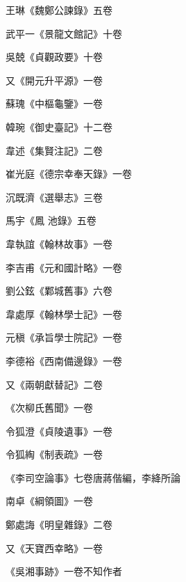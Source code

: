 \begin{pinyinscope}
 王琳《魏鄭公諫錄》五卷



 武平一《景龍文館記》十卷



 吳兢《貞觀政要》十卷



 又《開元升平源》一卷



 蘇瑰《中樞龜鑒》一卷



 韓琬《御史臺記》十二卷



 韋述《集賢注記》二卷



 崔光庭《德宗幸奉天錄》一卷



 沉既濟《選舉志》三卷



 馬宇《鳳
 池錄》五卷



 韋執誼《翰林故事》一卷



 李吉甫《元和國計略》一卷



 劉公鉉《鄴城舊事》六卷



 韋處厚《翰林學士記》一卷



 元稹《承旨學士院記》一卷



 李德裕《西南備邊錄》一卷



 又《兩朝獻替記》二卷



 《次柳氏舊聞》一卷



 令狐澄《貞陵遺事》一卷



 令狐綯《制表疏》一卷



 《李司空論事》七卷唐蔣偕編，李絳所論



 南卓《綱領圖》一卷



 鄭處誨《明皇雜錄》二卷



 又《天寶西幸略》一卷



 《吳湘事跡》一卷不知作者




\end{pinyinscope}
